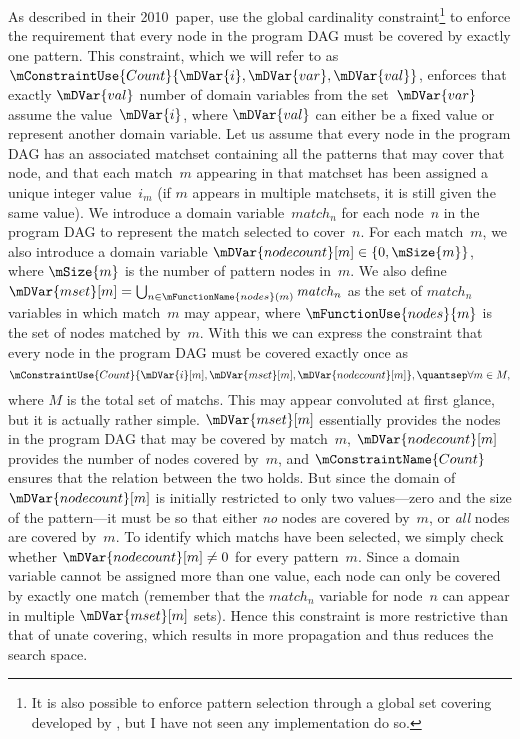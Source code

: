 As described in their 2010~paper, \citeauthor{Floch2010} use the \gls{global
  cardinality constraint}\footnote{It is also possible to enforce \gls{pattern
    selection} through a global set covering developed by
  \textcite{Mouthuy2007}, but I have not seen any implementation do so.} to
enforce the requirement that every \gls{node} in the \gls{program DAG} must be
covered by exactly one \gls{pattern}.
%
This constraint, which we will refer to as
\mbox{$\mConstraintUse{Count}{\mDVar{i}, \mDVar{var}, \mDVar{val}}$}, enforces
that exactly $\mDVar{val}$ number of \glspl{domain variable} from the
set~$\mDVar{var}$ assume the value~$\mDVar{i}$, where $\mDVar{val}$ can either
be a fixed value or represent another \gls{domain variable}.
%
Let us assume that
every \gls{node} in the \gls{program DAG} has an associated \gls{matchset}
containing all the \glspl{pattern} that may cover that \gls{node}, and that each
\gls{match}~$m$ appearing in that \gls{matchset} has been assigned a unique
integer value~$i_m$ (if $m$ appears in multiple \glspl{matchset}, it is still
given the same value).
%
We introduce a \gls{domain variable}~$\mathit{match}_n$
for each \gls{node}~$n$ in the \gls{program DAG} to represent the \gls{match}
selected to cover~$n$.
%
For each \gls{match}~$m$, we also introduce a \gls{domain
  variable} \mbox{$\mDVar{nodecount}[m] \in \mSet{0, \mSize{m}}$}, where
\mbox{$\mSize{m}$} is the number of \gls{pattern} \glspl{node} in~$m$.
%
We also
define \mbox{$\mDVar{mset}[m] = \bigcup_{n \in \mFunctionName{nodes}(m)}
  \mathit{match}_n$} as the set of $\mathit{match}_n$ variables in which
\gls{match}~$m$ may appear, where $\mFunctionUse{nodes}{m}$ is the set of
\glspl{node} matched by~$m$.
%
With this we can express the constraint that every
\gls{node} in the \gls{program DAG} must be covered exactly once as
%
\begin{displaymath}
  \mConstraintUse{Count}{\mDVar{i}[m], \mDVar{mset}[m], \mDVar{nodecount}[m]},
  \quantsep
  \forall m \in M,
\end{displaymath}
%
where $M$ is the total set of \glspl{match}.
%
This may appear convoluted at first
glance, but it is actually rather simple.
%
$\mDVar{mset}[m]$ essentially provides
the \glspl{node} in the \gls{program DAG} that may be covered by
\gls{match}~$m$, $\mDVar{nodecount}[m]$ provides the number of \glspl{node}
covered by~$m$, and $\mConstraintName{Count}$ ensures that the relation between
the two holds.
%
But since the domain of $\mDVar{nodecount}[m]$ is initially
restricted to only two values---zero and the size of the \gls{pattern}---it
must be so that either \emph{no} \glspl{node} are covered by~$m$, or \emph{all}
\glspl{node} are covered by~$m$.
%
To identify which \glspl{match} have been
selected, we simply check whether \mbox{$\mDVar{nodecount}[m] \neq 0$} for every
\gls{pattern}~$m$.
%
Since a \gls{domain variable} cannot be assigned more than
one value, each \gls{node} can only be covered by exactly one \gls{match}
(remember that the $\mathit{match}_n$ variable for \gls{node}~$n$ can appear in
multiple $\mDVar{mset}[m]$ sets).
%
Hence this constraint is more restrictive than
that of \gls{unate covering}, which results in more propagation and thus reduces
the search space.

